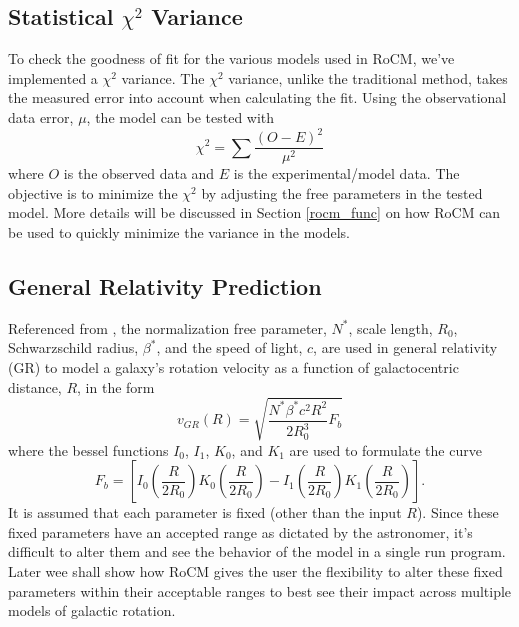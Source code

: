 \documentclass[conference]{IEEEtran-modified}
\begin{document}
\subsection{Statistical $\chi^2$ Variance}
To check the goodness of fit for the various models used in RoCM, we've implemented a $\chi^2$ variance. The $\chi^2$ variance, unlike the traditional method, takes the measured error into account when calculating the fit. Using the observational data error, $\mu$, the model can be tested with
\begin{equation}
\chi^2 = \sum \frac{(O-E)^2}{\mu^2}
\end{equation} 
where $O$ is the observed data and $E$ is the experimental/model data. The objective is to minimize the $\chi^2$ by adjusting the free parameters in the tested model.  More details will be discussed in Section \ref{rocm_func} on how RoCM can be used to quickly minimize the variance in the models.


\subsection{General Relativity Prediction}
Referenced from \cite{mannheim}, the normalization free parameter, $N^*$, scale length, $R_0$, Schwarzschild radius, $\beta^*$, and the speed of light, $c$, are used in general relativity (GR) to model a galaxy's rotation velocity as a function of galactocentric distance, $R$, in the form
\begin{equation}
v_{GR}(R) = \sqrt{\frac{N^*\beta^*c^2R^2}{2R^3_0}F_b}
\end{equation}
where the bessel functions $I_0$, $I_1$, $K_0$, and $K_1$ are used to formulate the curve
\begin{equation}
F_b = \left[I_0\left(\frac{R}{2R_0}\right)K_0\left(\frac{R}{2R_0}\right)-I_1\left(\frac{R}{2R_0}\right)K_1\left(\frac{R}{2R_0}\right)\right].
\end{equation}
It is assumed that each parameter is fixed (other than the input $R$). Since these fixed parameters have an accepted range as dictated by the astronomer, it's difficult to alter them and see the behavior of the model in a single run program.   Later wee shall show how RoCM gives the user the flexibility to alter these fixed parameters within their acceptable ranges to best see their impact across multiple models of galactic rotation. 
\end{document}
